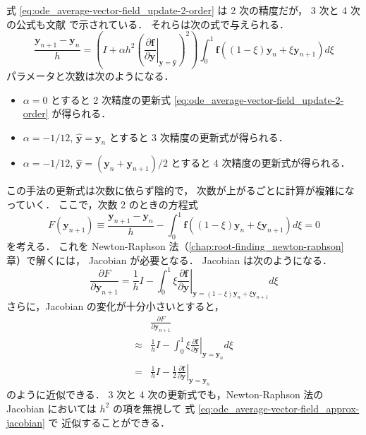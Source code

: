 式 \eqref{eq:ode_average-vector-field_update-2-order} は 2 次の精度だが，
3 次と 4 次の公式も文献 \cite{Quispel2008} で示されている．
それらは次の式で与えられる．
\begin{equation}
    \frac{\bm{y}_{n+1} - \bm{y}_n}{h}
    = \left(I + \alpha h^2
    \left(\left. \frac{\partial \bm{f}}{\partial \bm{y}} \right|_{\bm{y} = \hat{\bm{y}}}\right)^2
    \right)
    \int_{0}^{1} \bm{f}((1 - \xi) \bm{y}_n + \xi \bm{y}_{n+1}) d \xi
\end{equation}
パラメータと次数は次のようになる．
\begin{itemize}
    \item $\alpha = 0$ とすると 2 次精度の更新式
          \eqref{eq:ode_average-vector-field_update-2-order}
          が得られる．
    \item $\alpha = -1/12$, $\hat{\bm{y}} = \bm{y}_n$ とすると
          3 次精度の更新式が得られる．
    \item $\alpha = -1/12$, $\hat{\bm{y}} = (\bm{y}_n + \bm{y}_{n+1})/2$ とすると
          4 次精度の更新式が得られる．
\end{itemize}

この手法の更新式は次数に依らず陰的で，
次数が上がるごとに計算が複雑になっていく．
ここで，次数 2 のときの方程式
\begin{equation}
    F(\bm{y}_{n+1}) \equiv
    \frac{\bm{y}_{n+1} - \bm{y}_n}{h} -
    \int_{0}^{1} \bm{f}((1 - \xi) \bm{y}_n + \xi \bm{y}_{n+1}) d \xi
    = 0
\end{equation}
を考える．
これを Newton-Raphson 法（\ref{chap:root-finding_newton-raphson} 章）で解くには，
Jacobian が必要となる．
Jacobian は次のようになる．
\begin{equation}
    \frac{\partial F}{\partial \bm{y}_{n+1}} =
    \frac{1}{h} I -
    \int_{0}^{1} \xi \left. \frac{\partial \bm{f}}{\partial \bm{y}} \right|_{\bm{y} = (1 - \xi) \bm{y}_n + \xi \bm{y}_{n+1}} d \xi
\end{equation}
さらに，Jacobian の変化が十分小さいとすると，
\begin{align}
            & \frac{\partial F}{\partial \bm{y}_{n+1}}                                                \\
    \approx & \frac{1}{h} I -
    \int_{0}^{1} \xi \left. \frac{\partial \bm{f}}{\partial \bm{y}} \right|_{\bm{y} = \bm{y}_n} d \xi \\
    =       & \frac{1}{h} I - \frac{1}{2}
    \left. \frac{\partial \bm{f}}{\partial \bm{y}} \right|_{\bm{y} = \bm{y}_n}
    \label{eq:ode_average-vector-field_approx-jacobian}
\end{align}
のように近似できる．
3 次と 4 次の更新式でも，Newton-Raphson 法の Jacobian においては $h^2$ の項を無視して
式 \eqref{eq:ode_average-vector-field_approx-jacobian} で
近似することができる．
